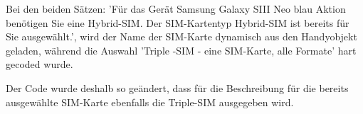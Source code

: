 \documentclass[11pt,a4paper]{article} %
\begin{document}
Bei den beiden Sätzen: 'Für das Gerät Samsung Galaxy SIII Neo blau Aktion benötigen Sie eine Hybrid-SIM. Der SIM-Kartentyp Hybrid-SIM ist bereits für Sie ausgewählt.', wird der Name der SIM-Karte dynamisch aus den Handyobjekt geladen, während die Auswahl 'Triple -SIM - eine SIM-Karte, alle Formate' hart gecoded wurde. 

Der Code wurde deshalb so geändert, dass für die Beschreibung für die bereits ausgewählte SIM-Karte ebenfalls die Triple-SIM ausgegeben wird.


\newpage
\end{document}
